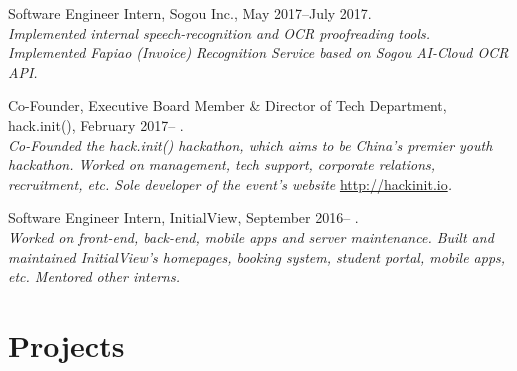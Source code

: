 \documentclass[letterpaper]{article}
\renewenvironment{itemize}{
  \begin{list}{}{
    \setlength{\leftmargin}{1.5em}
  }
}{
  \end{list}
}
\begin{document}
\begin{itemize}
  \item Software Engineer Intern, Sogou Inc., May 2017--July 2017.\\
  \emph{Implemented internal speech-recognition and OCR proofreading tools. Implemented Fapiao (Invoice) Recognition Service based on Sogou AI-Cloud OCR API.}

  \item Co-Founder, Executive Board Member \& Director of Tech Department, hack.init(), February 2017-- .\\
  \emph{Co-Founded the hack.init() hackathon, which aims to be China's premier youth hackathon. Worked on management, tech support, corporate relations, recruitment, etc. Sole developer of the event's website }\url{http://hackinit.io}\emph{.}

  \item Software Engineer Intern, InitialView, September 2016-- .\\
  \emph{Worked on front-end, back-end, mobile apps and server maintenance. Built and maintained InitialView's homepages, booking system, student portal, mobile apps, etc. Mentored other interns.}
\end{itemize}


\section*{Projects}
\end{document}
